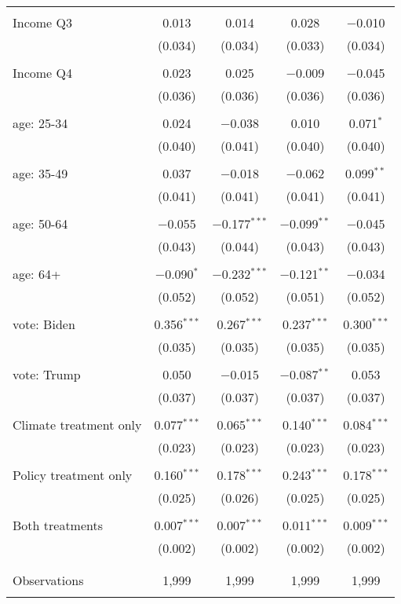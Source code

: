 \begin{tabular}{@{\extracolsep{5pt}}lcccc}
  & & & & \\ 
 Income Q3 & 0.013 & 0.014 & 0.028 & $-$0.010 \\ 
  & (0.034) & (0.034) & (0.033) & (0.034) \\ 
  & & & & \\ 
 Income Q4 & 0.023 & 0.025 & $-$0.009 & $-$0.045 \\ 
  & (0.036) & (0.036) & (0.036) & (0.036) \\ 
  & & & & \\ 
 age: 25-34 & 0.024 & $-$0.038 & 0.010 & 0.071$^{*}$ \\ 
  & (0.040) & (0.041) & (0.040) & (0.040) \\ 
  & & & & \\ 
 age: 35-49 & 0.037 & $-$0.018 & $-$0.062 & 0.099$^{**}$ \\ 
  & (0.041) & (0.041) & (0.041) & (0.041) \\ 
  & & & & \\ 
 age: 50-64 & $-$0.055 & $-$0.177$^{***}$ & $-$0.099$^{**}$ & $-$0.045 \\ 
  & (0.043) & (0.044) & (0.043) & (0.043) \\ 
  & & & & \\ 
 age: 64+ & $-$0.090$^{*}$ & $-$0.232$^{***}$ & $-$0.121$^{**}$ & $-$0.034 \\ 
  & (0.052) & (0.052) & (0.051) & (0.052) \\ 
  & & & & \\ 
 vote: Biden & 0.356$^{***}$ & 0.267$^{***}$ & 0.237$^{***}$ & 0.300$^{***}$ \\ 
  & (0.035) & (0.035) & (0.035) & (0.035) \\ 
  & & & & \\ 
 vote: Trump & 0.050 & $-$0.015 & $-$0.087$^{**}$ & 0.053 \\ 
  & (0.037) & (0.037) & (0.037) & (0.037) \\ 
  & & & & \\ 
 Climate treatment only & 0.077$^{***}$ & 0.065$^{***}$ & 0.140$^{***}$ & 0.084$^{***}$ \\ 
  & (0.023) & (0.023) & (0.023) & (0.023) \\ 
  & & & & \\ 
 Policy treatment only & 0.160$^{***}$ & 0.178$^{***}$ & 0.243$^{***}$ & 0.178$^{***}$ \\ 
  & (0.025) & (0.026) & (0.025) & (0.025) \\ 
  & & & & \\ 
 Both treatments & 0.007$^{***}$ & 0.007$^{***}$ & 0.011$^{***}$ & 0.009$^{***}$ \\ 
  & (0.002) & (0.002) & (0.002) & (0.002) \\ 
  & & & & \\ 
\hline \\[-1.8ex] 

Observations & 1,999 & 1,999 & 1,999 & 1,999 \\ 
\hline 
\hline \\[-1.8ex] 
\end{tabular} 
